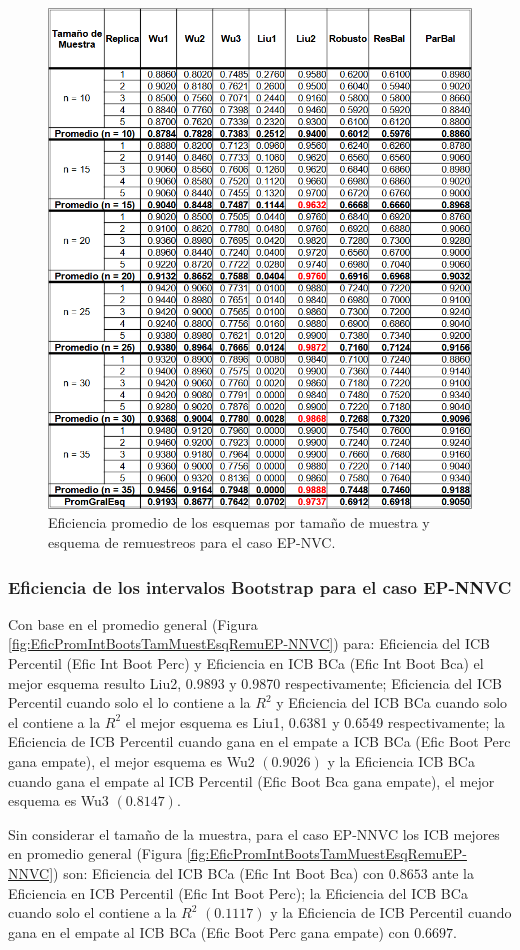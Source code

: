 \begin{figure}[H] 
	\centering 
	\includegraphics[width=0.70\linewidth]{img/EP_NVC_Efic_Esq.png} 
	\caption{Eficiencia promedio de los esquemas por tamaño de muestra y esquema de remuestreos para el caso EP-NVC.} 
	\label{fig:EficPromEsqTamMuesEsqRemuEP-NVC}
\end{figure}

\FloatBarrier

\subsubsection{Eficiencia de los intervalos Bootstrap para el caso EP-NNVC}
Con base en el promedio general (Figura \ref{fig:EficPromIntBootsTamMuestEsqRemuEP-NNVC}) para: Eficiencia del ICB Percentil (Efic Int Boot Perc) y Eficiencia en ICB BCa (Efic Int Boot Bca) el mejor esquema resulto Liu2, 0.9893 y 0.9870 respectivamente;
Eficiencia del ICB Percentil cuando solo el lo contiene a la $R^{2}$ y Eficiencia del ICB BCa cuando solo el contiene a la $R^{2}$ el mejor esquema es Liu1, 0.6381 y 0.6549 respectivamente; 
la Eficiencia de ICB Percentil cuando gana en el empate a ICB BCa (Efic Boot Perc gana empate), el mejor esquema es Wu2 $(0.9026)$ y la Eficiencia ICB BCa cuando gana el empate al ICB Percentil (Efic Boot Bca gana empate), el mejor esquema es Wu3 $(0.8147)$.
\vspace{.5cm}


Sin considerar el tamaño de la muestra, para el caso EP-NNVC los ICB mejores en promedio general  (Figura \ref{fig:EficPromIntBootsTamMuestEsqRemuEP-NNVC}) son: Eficiencia del ICB BCa (Efic Int Boot Bca) con $0.8653$ ante la Eficiencia en ICB Percentil (Efic Int Boot Perc); la Eficiencia del ICB BCa cuando solo el contiene a la $R^{2}$ $(0.1117)$ y la Eficiencia de ICB Percentil cuando gana en el empate al ICB BCa (Efic Boot Perc gana empate) con $0.6697$.



